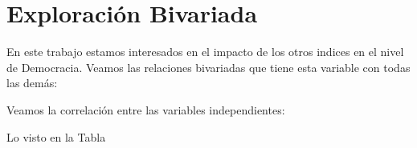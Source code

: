\section{Exploración Bivariada}

En este trabajo estamos interesados en el impacto de los otros indices en el nivel de Democracia. Veamos las relaciones bivariadas que tiene esta variable con todas las demás:





Veamos la correlación entre las variables independientes:




Lo visto en la Tabla %








\endinput
